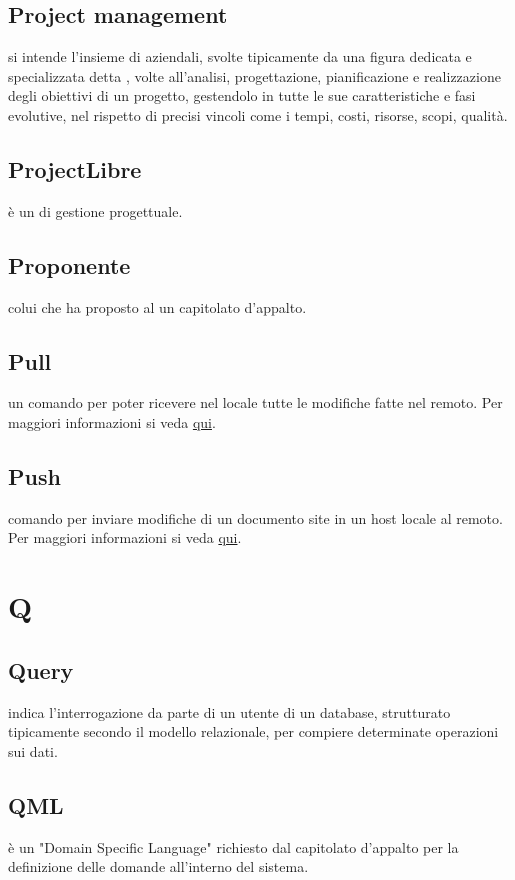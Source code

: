 \documentclass[12pt,a4paper]{article}
\begin{document}
\subsection{Project management} 
 si intende l'insieme di  aziendali, svolte tipicamente da una figura dedicata e specializzata detta , volte all'analisi, progettazione, pianificazione e realizzazione degli obiettivi di un progetto, gestendolo in tutte le sue caratteristiche e fasi evolutive, nel rispetto di precisi vincoli come i tempi, costi, risorse, scopi, qualità.

\subsection{ProjectLibre} 
 è un  di gestione progettuale.

\subsection{Proponente} 
 colui che ha proposto al  un capitolato d'appalto.

\subsection{Pull} 
 un comando  per poter ricevere nel locale tutte le modifiche fatte nel  remoto. Per maggiori informazioni si veda \href{https://git-scm.com/docs/}{qui}.

\subsection{Push} 
 comando  per inviare modifiche di un documento site in un host locale al  remoto. Per maggiori informazioni si veda \href{https://git-scm.com/docs/}{qui}.


\newpage

\section{Q}


\subsection{Query} 
indica l'interrogazione da parte di un utente di un database, strutturato tipicamente secondo il modello relazionale, per compiere determinate operazioni sui dati.
\subsection{QML} 
 è un "Domain Specific Language" richiesto dal capitolato d'appalto per la definizione delle domande all'interno del sistema.
\end{document}

